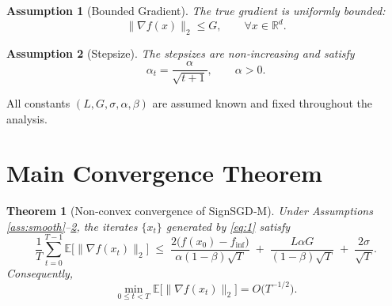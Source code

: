 \documentclass{article}
\newtheorem{theorem}{Theorem}
\newtheorem{assumption}{Assumption}
\newcommand{\E}{\mathbb{E}}
\newcommand{\R}{\mathbb{R}}
\begin{document}
\begin{assumption}[Bounded Gradient]\label{ass:bound}
The true gradient is uniformly bounded:
\[
\|\nabla f(x)\|_2\le G,\qquad\forall x\in\R^{d}.
\]
\end{assumption}

\begin{assumption}[Stepsize]\label{ass:stepsize}
The stepsizes are non‑increasing and satisfy
\[
\alpha_t = \frac{\alpha}{\sqrt{t+1}},\qquad 
\alpha>0.
\]
\end{assumption}

All constants $(L,G,\sigma,\alpha,\beta)$ are assumed known and fixed throughout the analysis.

\section*{Main Convergence Theorem}
\begin{theorem}[Non‑convex convergence of SignSGD‑M]\label{thm:main}
Under Assumptions \ref{ass:smooth}–\ref{ass:stepsize}, the iterates $\{x_t\}$ generated by \eqref{eq:1} satisfy
\[
\frac{1}{T}\sum_{t=0}^{T-1}
\E\!\big[\|\nabla f(x_t)\|_2\big]
\;\le\;
\frac{2\big(f(x_0)-f_{\inf}\big)}{\alpha(1-\beta)\sqrt{T}}
\;+\;
\frac{L\alpha G}{(1-\beta)\sqrt{T}}
\;+\;
\frac{2\sigma}{\sqrt{T}} .
\tag{3}
\]
Consequently,
\[
\min_{0\le t<T}\E\!\big[\|\nabla f(x_t)\|_2\big]=O\!\big(T^{-1/2}\big).
\]
\end{theorem}
\end{document}
